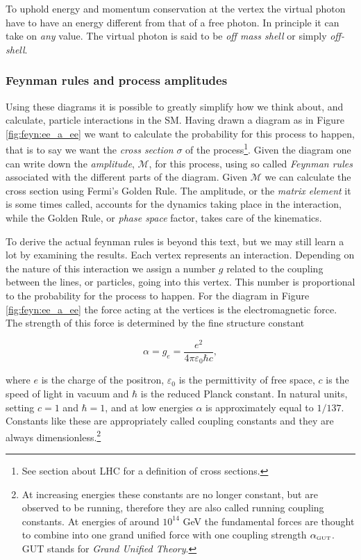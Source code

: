 To uphold energy and momentum conservation at the vertex the virtual photon have to have an energy different from that of a free photon. In principle it can take on \emph{any} value. The virtual photon is said to be \emph{off mass shell} or simply \emph{off-shell}.

\subsubsection{Feynman rules and process amplitudes}
Using these diagrams it is possible to greatly simplify how we think about, and calculate, particle interactions in the SM. Having drawn a diagram as in Figure \ref{fig:feyn:ee_a_ee} we want to calculate the probability for this process to happen, that is to say we want the \emph{cross section} $\sigma$ of the process\footnote{See section about LHC for a definition of cross sections.}. Given the diagram one can write down the \emph{amplitude}, $\mathcal{M}$, for this process, using so called \emph{Feynman rules} associated with the different parts of the diagram. Given $\mathcal{M}$ we can calculate the cross section using Fermi's Golden Rule. The amplitude, or the \emph{matrix element} it is some times called, accounts for the dynamics taking place in the interaction, while the Golden Rule, or \emph{phase space} factor, takes care of the kinematics.

To derive the actual feynman rules is beyond this text, but we may still learn a lot by examining the results. Each vertex represents an interaction. Depending on the nature of this interaction we assign a number $g$ related to the coupling between the lines, or particles, going into this vertex. This number is proportional to the probability for the process to happen. For the diagram in Figure \ref{fig:feyn:ee_a_ee} the force acting at the vertices is the electromagnetic force. The strength of this force is determined by the fine structure constant 

\begin{equation}
	\alpha = g_e = \frac{e^2}{4\pi\varepsilon_0\hbar c},
\end{equation}

where $e$ is the charge of the positron, $\varepsilon_0$ is the permittivity of free space, $c$ is the speed of light in vacuum and $\hbar$ is the reduced Planck constant. In natural units, setting $c = 1$ and $\hbar = 1$, and at low energies $\alpha$ is approximately equal to $1/137$. Constants like these are appropriately called coupling constants and they are always dimensionless.\footnote{At increasing energies these constants are no longer constant, but are observed to be running, therefore they are also called running coupling constants. At energies of around $10^{14}$ GeV the fundamental forces are thought to combine into one grand unified force with one coupling strength $\alpha_{\textrm{\tiny{GUT}}}$. GUT stands for \emph{Grand Unified Theory}.}

